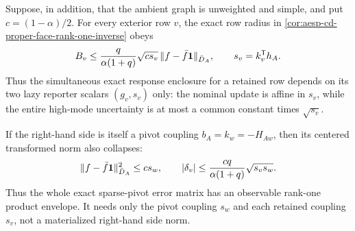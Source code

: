 \begin{corollary}
\label{cor:aesp-cd-proper-face-unweighted-row-band}
Suppose, in addition, that the ambient graph is unweighted and simple, and
put \(c=(1-\alpha)/2\).  For every exterior row \(v\), the exact row radius in
\cref{cor:aesp-cd-proper-face-rank-one-inverse} obeys
\begin{equation}
 B_v\leq
 \frac{q}{\alpha(1+q)}
 \sqrt{c s_v}\,
 \lVert f-\bar f\mathbf{1}\rVert_{\bar D_A},
 \qquad s_v=k_v^{\mathsf T}h_A.
 \label{eq:aesp-cd-proper-face-unweighted-row-band}
\end{equation}
Thus the simultaneous exact response enclosure for a retained row depends
on its two lazy reporter scalars \((g_v,s_v)\) only: the nominal update is
affine in \(s_v\), while the entire high-mode uncertainty is at most a common
constant times \(\sqrt{s_v}\).

If the right-hand side is itself a pivot coupling
\(b_A=k_w=-H_{Aw}\), then its centered transformed norm also collapses:
\begin{equation}
 \lVert f-\bar f\mathbf{1}\rVert_{\bar D_A}^2\leq c s_w,
 \qquad
 |\delta_v|
 \leq\frac{cq}{\alpha(1+q)}\sqrt{s_vs_w}.
 \label{eq:aesp-cd-proper-face-pivot-product-band}
\end{equation}
Thus the whole exact sparse-pivot error matrix has an observable rank-one
product envelope.  It needs only the pivot coupling \(s_w\) and each retained
coupling \(s_v\), not a materialized right-hand side norm.


\end{corollary}
